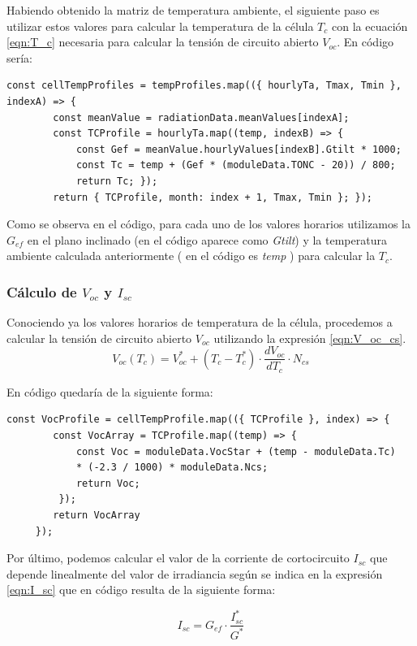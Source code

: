 Habiendo obtenido la matriz de temperatura ambiente, el siguiente paso es utilizar estos valores para calcular la temperatura de la célula $T_c$ con la ecuación \ref{eqn:T_c} necesaria para calcular la tensión de circuito abierto $V_{oc}$.
En código sería:
\begin{lstlisting}[style=ES6, caption={Cálculo de la temperatura de célula}]
	const cellTempProfiles = tempProfiles.map(({ hourlyTa, Tmax, Tmin }, indexA) => {
		const meanValue = radiationData.meanValues[indexA];
		const TCProfile = hourlyTa.map((temp, indexB) => {
			const Gef = meanValue.hourlyValues[indexB].Gtilt * 1000;
			const Tc = temp + (Gef * (moduleData.TONC - 20)) / 800; 
			return Tc; });
		return { TCProfile, month: index + 1, Tmax, Tmin }; });
\end{lstlisting}

Como se observa en el código, para cada uno de los valores horarios utilizamos la $G_{ef}$ en el plano inclinado (en el código aparece como \textit{Gtilt}) y la temperatura ambiente calculada anteriormente ( en el código es \textit{temp} ) para calcular la $T_c$.
\subsubsection{Cálculo de $V_{oc}$ y $I_{sc}$}
\label{section:calc_voc_isc}

Conociendo ya los valores horarios de temperatura de la célula, procedemos a calcular la tensión de circuito abierto $V_{oc}$ utilizando la expresión \ref{eqn:V_oc_cs}.
\begin{equation}
\label{eqn:V_oc_cs}
V_{oc}(T_c) = V_{oc}^* + (T_c - T_c^*) \cdot \frac{dV_{oc}}{dT_c} \cdot N_{cs}
\end{equation}

En código quedaría de la siguiente forma:
\begin{lstlisting}[style=ES6, caption={Cálculo de la tensión de circuito abierto}]
	const VocProfile = cellTempProfile.map(({ TCProfile }, index) => {
		const VocArray = TCProfile.map((temp) => {
			const Voc = moduleData.VocStar + (temp - moduleData.Tc) 
			* (-2.3 / 1000) * moduleData.Ncs;
			return Voc;
		 });
		return VocArray
	 });
\end{lstlisting}
Por último, podemos calcular el valor de la corriente de cortocircuito $I_{sc}$ que depende linealmente del valor de irradiancia según se indica en la expresión \ref{eqn:I_sc} que en código resulta de la siguiente forma:

\begin{equation}
\label{eqn:I_sc}
I_{sc} = G_{ef} \cdot  \frac{I_{sc}^*}{G^*}
\end{equation}

